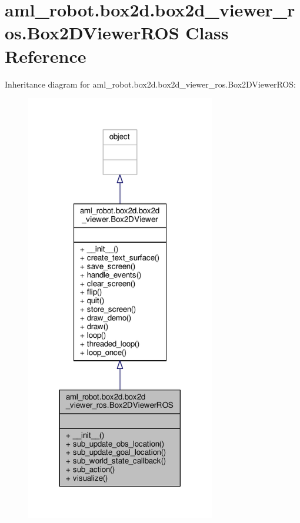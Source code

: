 \hypertarget{classaml__robot_1_1box2d_1_1box2d__viewer__ros_1_1_box2_d_viewer_r_o_s}{\section{aml\-\_\-robot.\-box2d.\-box2d\-\_\-viewer\-\_\-ros.\-Box2\-D\-Viewer\-R\-O\-S Class Reference}
\label{classaml__robot_1_1box2d_1_1box2d__viewer__ros_1_1_box2_d_viewer_r_o_s}
}


Inheritance diagram for aml\-\_\-robot.\-box2d.\-box2d\-\_\-viewer\-\_\-ros.\-Box2\-D\-Viewer\-R\-O\-S\-:
\nopagebreak
\begin{figure}[H]
\begin{center}
\leavevmode
\includegraphics[width=234pt]{classaml__robot_1_1box2d_1_1box2d__viewer__ros_1_1_box2_d_viewer_r_o_s__inherit__graph}
\end{center}
\end{figure}


